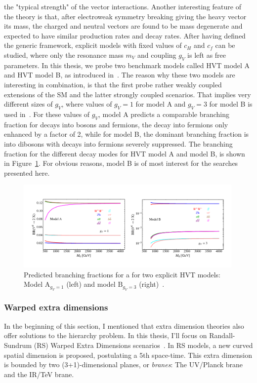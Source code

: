 the "typical strength" of the vector interactions. Another interesting feature of the theory is that, after electroweak symmetry breaking giving the heavy vector its mass, the charged and neutral vectors are found to be mass degenerate and expected to have similar production rates and decay rates.\newline
After having defined the generic framework, explicit models with fixed values of $c_H$ and $c_f$ can be studied, where only the resonance mass $m_V$ and coupling $g_V$ is left as free parameters.
In this thesis, we probe two benchmark models called HVT model A and HVT model B, as introduced in~\cite{Pappadopulo:2014qza}. The reason why these two models are interesting in combination, is that the first probe rather weakly coupled extensions of the SM and the latter strongly coupled scenarios. That implies very different sizes of $g_V$, where values of $g_V = 1$ for model A and $g_V = 3$ for model B is used in~\cite{Pappadopulo:2014qza}. For these values of $g_V$, model A predicts a comparable branching fraction for decays into bosons and fermions, the decay into fermions only enhanced by a factor of 2, while for model B, the dominant branching fraction is into dibosons with decays into fermions severely suppressed. The branching fraction for the different decay modes for HVT model A and model B, is shown in Figure~\ref{fig:theory:hvtBR}. For obvious reasons, model B is of most interest for the searches presented here.
\begin{figure}[h!]
\centering
\includegraphics[width=0.99\textwidth]{figures/theory/hvtmodels.pdf}
\caption{Predicted branching fractions for a \PZpr for two explicit HVT models: Model  $\mathrm{A}_{g_V=1}$ (left) and model $\mathrm{B}_{g_V=3}$ (right)~\cite{Pappadopulo:2014qza}.}
\label{fig:theory:hvtBR}
\end{figure}

\subsubsection{Warped extra dimensions}
\label{sec:theory:wed}
In the beginning of this section, I mentioned that extra dimension theories also offer solutions to the hierarchy problem. In this thesis, I'll focus on Randall-Sundrum (RS) Warped Extra Dimensions scenarios~\cite{PhysRevLett.83.3370}. In RS models, a new curved spatial dimension is proposed, postulating a 5th space-time. This extra dimension is bounded by two (3+1)-dimensional planes, or \emph{branes}: The UV/Planck brane and the IR/TeV brane. 

